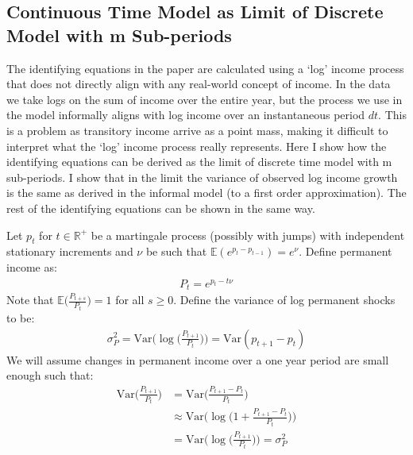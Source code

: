 \subsection{Continuous Time Model as Limit of Discrete Model with m Sub-periods} \label{log_tranformation}
The identifying equations in the paper are calculated using a `log' income process that does not directly align with any real-world concept of income. In the data we take logs on the sum of income over the entire year, but the process we use in the model informally aligns with log income over an instantaneous period $dt$. This is a problem as transitory income arrive as a point mass, making it difficult to interpret what the `log' income process really represents. Here I show how the identifying equations can be derived as the limit of discrete time model with m sub-periods. I show that in the limit the variance of observed log income growth is the same as derived in the informal model (to a first order approximation). The rest of the identifying equations can be shown in the same way.

Let $p_t$ for $t\in\mathbb{R}^+$ be a martingale process (possibly with jumps) with independent stationary increments and $\nu$ be such that $\mathbb{E}(e^{p_t - p_{t-1}})=e^{\nu}$. Define permanent income as:
\begin{align*}
P_t = e^{p_t - t \nu}
\end{align*}
Note that $\mathbb{E}\Big(\frac{P_{t+s}}{P_t}\Big)=1$ for all $s\geq 0$. Define the variance of log permanent shocks to be:
\begin{align*} \sigma^2_P=\mathrm{Var}\Big(\log\big(\frac{P_{t+1}}{P_t}\big)\Big) = \mathrm{Var}(p_{t+1}-p_t)
\end{align*}
We will assume changes in permanent income over a one year period are small enough such that:
\begin{align} \mathrm{Var}\Big(\frac{P_{t+1}}{P_t}\Big) &= \mathrm{Var}\Big(\frac{P_{t+1}-P_t}{P_t}\Big) \nonumber \\
& \approx \mathrm{Var}\Big(\log\big(1+\frac{P_{t+1}-P_t}{P_t}\big)\Big) \nonumber \\
&= \mathrm{Var}\Big(\log\big(\frac{P_{t+1}}{P_t}\big)\Big) = \sigma^2_P \label{permvar_approx}
\end{align}

